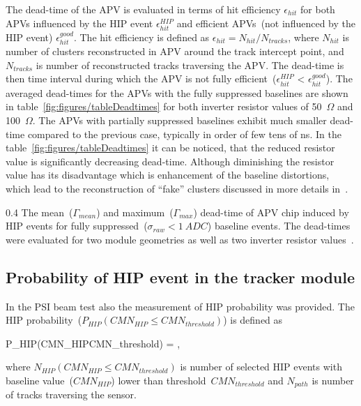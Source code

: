 The dead-time of the APV is evaluated in terms of hit efficiency $\epsilon_{hit}$ for both APVs influenced by the HIP event $\epsilon_{hit}^{HIP}$ and efficient APVs~(not influenced by the HIP event) $\epsilon_{hit}^{good}$. The hit efficiency is defined as $\epsilon_{hit} = N_{hit}/N_{tracks}$, where $N_{hit}$ is number of clusters reconstructed in APV around the track intercept point, and $N_{tracks}$ is number of reconstructed tracks traversing the APV. The dead-time is then time interval during which the APV is not fully efficient~($\epsilon_{hit}^{HIP}$ < $\epsilon_{hit}^{good}$). The averaged dead-times for the APVs with the fully suppressed baselines are shown in table~\ref{fig:figures/tableDeadtimes} for both inverter resistor values of 50~$\Omega$ and 100~$\Omega$. The APVs with partially suppressed baselines exhibit much smaller dead-time compared to the previous case, typically in order of few tens of ns. In the table~\ref{fig:figures/tableDeadtimes} it can be noticed, that the reduced resistor value is significantly decreasing dead-time. Although diminishing the resistor value has its disadvantage which is enhancement of the baseline distortions, which lead to the reconstruction of ``fake'' clusters discussed in more details in~\cite{Bainbridge:2004jc}.

                 {0.4}       %
                 {The mean~($\Gamma_{mean}$) and maximum~($\Gamma_{max}$) dead-time of APV chip induced by HIP events for fully suppressed~($\sigma_{raw}<1~ADC$) baseline events. The dead-times were evaluated for two module geometries as well as two inverter resistor values~\cite{Bainbridge:2004jc}.} %


\subsection{Probability of HIP event in the tracker module}

In the PSI beam test also the measurement of HIP probability was provided. The HIP probability~($P_{HIP}(CMN_{HIP}\leq CMN_{threshold})$) is defined as 

{
P_{HIP}(CMN_{HIP}\leq CMN_{threshold}) = ,
}

where $N_{HIP}(CMN_{HIP}\leq CMN_{threshold})$ is number of selected HIP events with baseline value~($CMN_{HIP}$) lower than threshold~$CMN_{threshold}$ and $N_{path}$ is number of tracks traversing the sensor.

